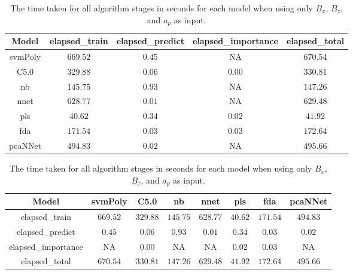 \begin{table}[!ht]
	\centering
	\begin{tabular}{|c|c|c|c|c|}
		\hline
		Model & elapsed_train & elapsed_predict & elapsed_importance & elapsed_total \\ \hline
		svmPoly & $669.52$ & $0.45$ & NA & $670.54$ \\ \hline
		C5.0 & $329.88$ & $0.06$ & $0.00$ & $330.81$ \\ \hline
		nb & $145.75$ & $0.93$ & NA & $147.26$ \\ \hline
		nnet & $628.77$ & $0.01$ & NA & $629.48$ \\ \hline
		pls & $40.62$ & $0.34$ & $0.02$ & $41.92$ \\ \hline
		fda & $171.54$ & $0.03$ & $0.03$ & $172.64$ \\ \hline
		pcaNNet & $494.83$ & $0.02$ & NA & $495.66$ \\ \hline
	\end{tabular}
	\caption{The time taken for all algorithm stages in seconds for each model when using only $B_{x}$, $B_{z}$, and $a_{p}$ as input.}
	\label{tab:time:xzap}
\end{table}

\begin{table}[!ht]
	\centering
	\begin{tabular}{|c|c|c|c|c|c|c|c|}
		\hline
		Model & svmPoly & C5.0 & nb & nnet & pls & fda & pcaNNet \\ \hline
		elapsed_train & $669.52$ & $329.88$ & $145.75$ & $628.77$ & $40.62$ & $171.54$ & $494.83$ \\ \hline
		elapsed_predict & $0.45$ & $0.06$ & $0.93$ & $0.01$ & $0.34$ & $0.03$ & $0.02$ \\ \hline
		elapsed_importance & NA & $0.00$ & NA & NA & $0.02$ & $0.03$ & NA \\ \hline
		elapsed_total & $670.54$ & $330.81$ & $147.26$ & $629.48$ & $41.92$ & $172.64$ & $495.66$ \\ \hline
	\end{tabular}
	\caption{The time taken for all algorithm stages in seconds for each model when using only $B_{x}$, $B_{z}$, and $a_{p}$ as input.}
	\label{tab:time:reverse:xzap}
\end{table}

